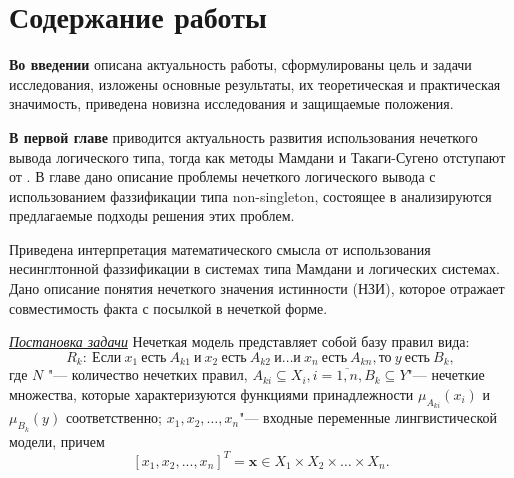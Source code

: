 


\section*{Содержание работы}

\textbf{Во введении} описана актуальность работы, сформулированы цель и задачи исследования, изложены основные результаты, их теоретическая и практическая значимость, приведена новизна исследования и защищаемые положения. 


\textbf{В первой главе} приводится актуальность развития использования нечеткого вывода логического типа, тогда как методы Мамдани и Такаги-Сугено отступают от . В главе дано описание проблемы нечеткого логического вывода с использованием фаззификации типа non-singleton,  состоящее в анализируются предлагаемые подходы решения этих проблем.

Приведена интерпретация математического смысла от использования несинглтонной фаззификации в системах типа Мамдани и логических системах. Дано описание понятия нечеткого значения истинности (НЗИ), которое отражает совместимость факта с посылкой в нечеткой форме.

\underline{\textit{Постановка задачи}} 
Нечеткая модель представляет собой базу правил вида:
\begin{equation}
	\label{eqn:fuz-problem-1}
	R_k:\ \text{Если}\ x_1\ \text{есть}\ A_{k1}\ \text{и}\ x_2\ \text{есть}\ A_{k2}\ \text{и} \dots \text{и}\ x_n\ \text{есть}\ A_{kn}, \text{то}\ y\ \text{есть}\ B_k,
\end{equation}
где $N$ "--- количество нечетких правил, $A_{ki} \subseteq X_i, i=\overline{1,n}, B_k \subseteq Y$"--- нечеткие множества, которые характеризуются функциями принадлежности $\mu_{A_{ki}}(x_i)$ и $\mu_{B_k}(y)$ соответственно; $x_1, x_2,…,x_n$"--- входные переменные лингвистической модели, причем
\[
[x_1, x_2, ..., x_n]^T = \mathbf{x} \in X_1 \times X_2 \times \dots \times X_n.
\]

